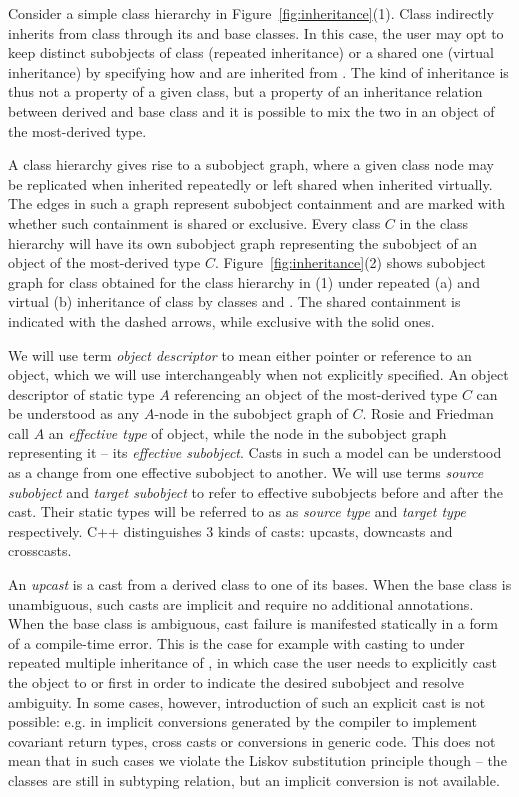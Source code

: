 \noindent
Consider a simple class hierarchy in Figure~\ref{fig:inheritance}(1). Class 
 indirectly inherits from class  through its  and 
 base classes. In this case, the user may opt to keep distinct 
subobjects of class  (repeated inheritance) or a shared one (virtual 
inheritance) by specifying how  and  are inherited from 
. The kind of inheritance is thus not a property of a given class, but a 
property of an inheritance relation between derived and base class and it is 
possible to mix the two in an object of the most-derived type. 

A class hierarchy gives rise to a subobject graph, 
where a given class node may be replicated when inherited repeatedly or left 
shared when inherited virtually. The edges in such a graph represent subobject 
containment and are marked with whether such containment is shared or 
exclusive. Every class $C$ in the class hierarchy will have its own subobject 
graph representing the subobject of an object of the most-derived type $C$.
Figure~\ref{fig:inheritance}(2) shows subobject graph for class  
obtained for the class hierarchy in (1) under repeated (a) and virtual (b) 
inheritance of class  by classes  and . The shared 
containment is indicated with the dashed arrows, while exclusive with the solid 
ones.

We will use term \emph{object descriptor} to mean either pointer or reference to 
an object, which we will use interchangeably when not explicitly specified. 
An object descriptor of static type $A$ referencing an object of the most-derived 
type $C$ can be understood as any \code{*::}$A$-node in the subobject graph of $C$. Rosie 
and Friedman call $A$ an \emph{effective type} of object, while the node in the 
subobject graph representing it -- its \emph{effective subobject}. 
Casts in such a model can be understood as a change from one effective subobject 
to another. We will use terms \emph{source subobject} and \emph{target 
subobject} to refer to effective subobjects before and after the cast. Their 
static types will be referred to as as \emph{source type} and \emph{target type} 
respectively. C++ distinguishes 3 kinds of casts: upcasts, downcasts and 
crosscasts.

An \emph{upcast} is a cast from a derived class to one of its bases. When the 
base class is unambiguous, such casts are implicit and require no additional 
annotations. When the base class is ambiguous, cast failure is manifested 
statically in a form of a compile-time error. This is the case for example with 
casting  to  under repeated multiple inheritance of , 
in which case the user needs to explicitly cast the object to  or 
 first in order to indicate the desired subobject and resolve ambiguity. 
In some cases, however, introduction of such an explicit cast is not possible: 
e.g. in implicit conversions generated by the compiler to implement covariant 
return types, cross casts or conversions in generic code. This does not mean 
that in such cases we violate the Liskov substitution principle though -- the 
classes are still in subtyping relation, but an implicit conversion is not 
available.

